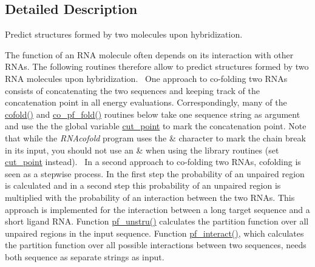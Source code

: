\subsection{Detailed Description}
Predict structures formed by two molecules upon hybridization. 

The function of an R\+N\+A molecule often depends on its interaction with other R\+N\+As. The following routines therefore allow to predict structures formed by two R\+N\+A molecules upon hybridization.~\newline
One approach to co-\/folding two R\+N\+As consists of concatenating the two sequences and keeping track of the concatenation point in all energy evaluations. Correspondingly, many of the \hyperlink{group__mfe__cofold_gabc8517f22cfe70595ee81fc837910d52}{cofold()} and \hyperlink{part__func__co_8h_ae5c1e7331718669bdae7a86de2be6184}{co\+\_\+pf\+\_\+fold()} routines below take one sequence string as argument and use the the global variable \hyperlink{fold__vars_8h_ab9b2c3a37a5516614c06d0ab54b97cda}{cut\+\_\+point} to mark the concatenation point. Note that while the {\itshape R\+N\+Acofold} program uses the \textquotesingle{}\&\textquotesingle{} character to mark the chain break in its input, you should not use an \textquotesingle{}\&\textquotesingle{} when using the library routines (set \hyperlink{fold__vars_8h_ab9b2c3a37a5516614c06d0ab54b97cda}{cut\+\_\+point} instead).~\newline
In a second approach to co-\/folding two R\+N\+As, cofolding is seen as a stepwise process. In the first step the probability of an unpaired region is calculated and in a second step this probability of an unpaired region is multiplied with the probability of an interaction between the two R\+N\+As. This approach is implemented for the interaction between a long target sequence and a short ligand R\+N\+A. Function \hyperlink{group__up__cofold_ga5b4ee40e190d2f633cd01cf0d2fe93cf}{pf\+\_\+unstru()} calculates the partition function over all unpaired regions in the input sequence. Function \hyperlink{group__up__cofold_ga1aa0aa02bc3a724f87360c03097afd00}{pf\+\_\+interact()}, which calculates the partition function over all possible interactions between two sequences, needs both sequence as separate strings as input. 